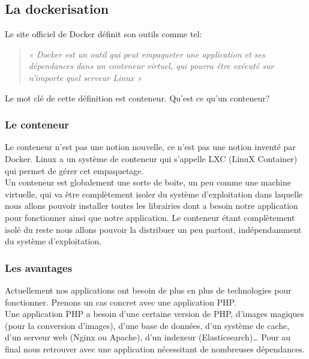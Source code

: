 \documentclass{report}
\begin{document}
      \subsection{La dockerisation}
      Le site officiel de Docker définit son outils comme tel:\\

      \begin{quotation}
        \emph{« Docker est un outil qui peut empaqueter une application et ses dépendances dans un conteneur virtuel, qui pourra être exécuté sur n’importe quel serveur Linux »}\\
      \end{quotation}

      Le mot clé de cette définition est conteneur. Qu’est ce qu’un conteneur?

        \subsubsection{Le conteneur}
        Le conteneur n’est pas une notion nouvelle, ce n’est pas une notion inventé par Docker. Linux a un système de conteneur qui s’appelle LXC (LinuX Container) qui permet de gérer cet empaquetage.\\

        Un conteneur est globalement une sorte de boite, un peu comme une machine virtuelle, qui va être complètement isoler du système d’exploitation dans laquelle nous allons pouvoir installer toutes les librairies dont a besoin notre application pour fonctionner ainsi que notre application. Le conteneur étant complètement isolé du reste nous allons pouvoir la distribuer un peu partout, indépendamment du système d’exploitation.

        \subsubsection{Les avantages}
        Actuellement nos applications ont besoin de plus en plus de technologies pour fonctionner. Prenons un cas concret avec une application PHP.\\

        Une application PHP a besoin d’une certaine version de PHP, d’images magiques (pour la conversion d’images), d’une base de données, d’un système de cache, d’un serveur web (Nginx ou Apache), d’un indexeur (Elasticsearch)… Pour au final nous retrouver avec une application nécessitant de nombreuses dépendances.\\
\end{document}
